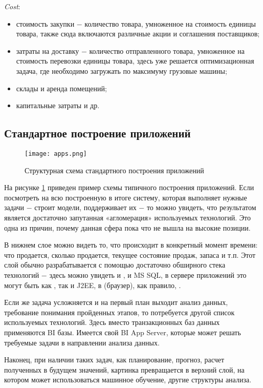 \emph{Cost}:
\begin{itemize}
  \item стоимость закупки ​− количество товара, умноженное на стоимость единицы товара, также сюда включаются различные акции и соглашения поставщиков;
  \item затраты на доставку ​− количество отправленного товара, умноженное на стоимость перевозки единицы товара, здесь уже решается оптимизационная задача, где необходимо загружать по максимуму грузовые машины;
  \item склады и аренда помещений;
  \item капитальные затраты и др.
\end{itemize}

\subsection{Стандартное построение приложений}
\label{sec:domain:standard_app}

\begin{figure}
	\centering
	\texttt{[image: apps.png]}
	\caption{Структурная схема стандартного построения приложений}
	\label{fig:domain:standard_app:app_scheme}
\end{figure}

На рисунке \ref{fig:domain:standard_app:app_scheme} приведен пример схемы типичного построения приложений. Если посмотреть на всю построенную в итоге систему, которая выполняет нужные задачи ​− строит модели, поддерживает их ​− то можно увидеть, что результатом является достаточно запутанная «агломерация» используемых технологий. Это одна из причин, почему данная сфера пока что не вышла на высокие позиции.

В нижнем слое можно видеть то, что происходит в конкретный момент времени: что продается, сколько продается, текущее состояние продаж, запаса и т.п. Этот слой обычно разрабатывается с помощью достаточно обширного стека технологий ​− здесь можно увидеть и \oracle, и MS SQL, в сервере приложений это могут быть как \dotnet, так и J2EE, в \ui (браузер), как правило, \js.

Если же задача усложняется и на первый план выходит анализ данных, требование понимания пройденных этапов, то потребуется другой список используемых технологий. Здесь вместо транзакционных баз данных применяются BI базы. Имеется свой BI App Server, которые может решать требуемые задачи в направлении анализа данных.

Наконец, при наличии таких задач, как планирование, прогноз, расчет полученных в будущем значений, картинка превращается в верхний слой, на котором может использоваться машинное обучение, другие структуры анализа.

